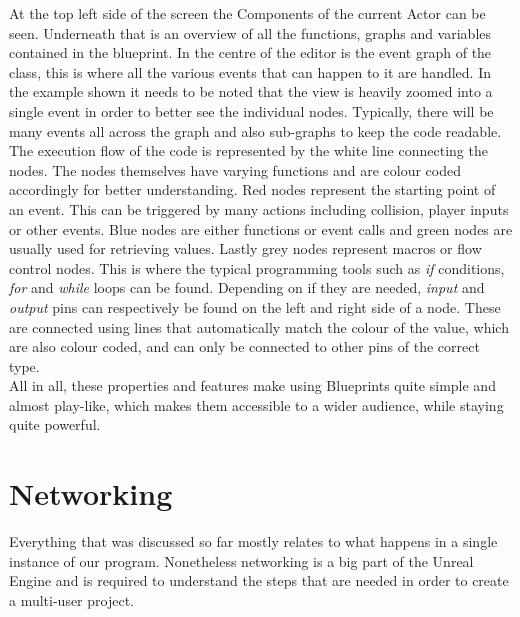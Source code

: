 At the top left side of the screen the Components of the current Actor can be seen. Underneath that is an overview of all the functions, graphs and variables contained in the blueprint. In the centre of the editor is the event graph of the class, this is where all the various events that can happen to it are handled. In the example shown it needs to be noted that the view is heavily zoomed into a single event in order to better see the individual nodes. Typically, there will be many events all across the graph and also sub-graphs to keep the code readable.\\
The execution flow of the code is represented by the white line connecting the nodes. The nodes themselves have varying functions and are colour coded accordingly for better understanding. Red nodes represent the starting point of an event. This can be triggered by many actions including collision, player inputs or other events. Blue nodes are either functions or event calls and green nodes are usually used for retrieving values. Lastly grey nodes represent macros or flow control nodes. This is where the typical programming tools such as \textit{if} conditions, \textit{for} and \textit{while} loops can be found.
Depending on if they are needed, \textit{input} and \textit{output} pins can respectively be found on the left and right side of a node. These are connected using lines that automatically match the colour of the value, which are also colour coded, and can only be connected to other pins of the correct type.\\
All in all, these properties and features make using Blueprints quite simple and almost play-like, which makes them accessible to a wider audience, while staying quite powerful.

\section{Networking}

Everything that was discussed so far mostly relates to what happens in a single instance of our program. Nonetheless networking is a big part of the Unreal Engine and is required to understand the steps that are needed in order to create a multi-user project.\\

